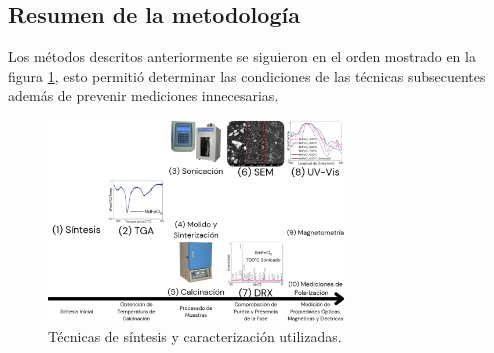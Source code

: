 \documentclass[../main.tex]{subfiles}
\begin{document}
\subsection{Resumen de la metodología}
Los métodos descritos anteriormente se siguieron en el orden mostrado en la figura \ref{fig:resdiag}, esto permitió determinar las condiciones de las técnicas subsecuentes además de prevenir mediciones innecesarias.
\begin{figure}[H]
    \centering
    \includegraphics[width=0.7\textwidth]{fig/diagresultados.png}
    \caption{Técnicas de síntesis y caracterización utilizadas.}
    \label{fig:resdiag}
\end{figure}
\end{document}
